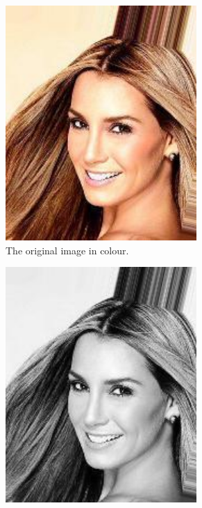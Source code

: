 \documentclass{article}
\begin{document}
 		\begin{figure}[htb]
 			\centering
 			\begin{subfigure}{0.2\textwidth}
 				\centering
 				\includegraphics[width=0.8\textwidth]{a2_original_img.jpg}
 				\caption{The original image in colour.}
 				\label{fig:a2_original_img}	
 			\end{subfigure}
 			\hspace{1em}
 			\begin{subfigure}{0.2\textwidth}
 				\centering
 				\includegraphics[width=0.8\textwidth]{a2_greyscale_img.png}

\end{subfigure}
\end{figure}
\end{document}
